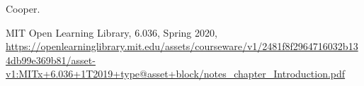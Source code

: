 \documentclass[11pt]{article}
\numberwithin{equation}{section}
\theoremstyle{definition}%
\begin{document}
\begin{thebibliography}{2}
     Cooper.

     {MIT Open Learning Library, 6.036, Spring 2020, \url{https://openlearninglibrary.mit.edu/assets/courseware/v1/2481f8f2964716032b134db99e369b81/asset-v1:MITx+6.036+1T2019+type@asset+block/notes_chapter_Introduction.pdf}}

\end{thebibliography}
\end{document}
